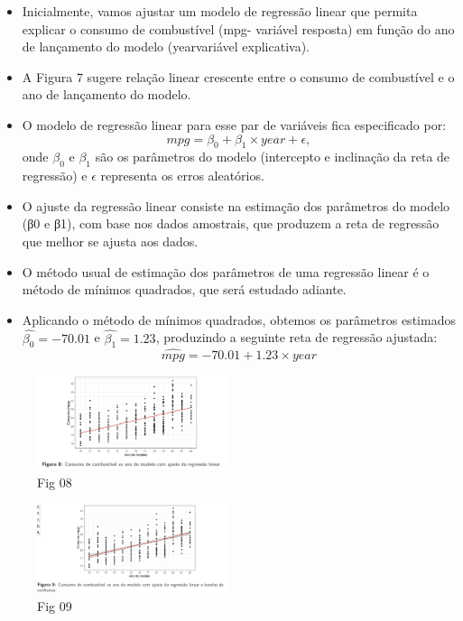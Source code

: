 \documentclass[
]{article}
\begin{document}
\begin{itemize}
\item
  Inicialmente, vamos ajustar um modelo de regressão linear que permita
  explicar o consumo de combustível (mpg- variável resposta) em função
  do ano de lançamento do modelo (yearvariável explicativa).
\item
  A Figura 7 sugere relação linear crescente entre o consumo de
  combustível e o ano de lançamento do modelo.
\item
  O modelo de regressão linear para esse par de variáveis fica
  especificado por: \[
  mpg = \beta_0 + \beta_1 \times year + \epsilon,
  \] onde \(\beta_0\) e \(\beta_1\) são os parâmetros do modelo
  (intercepto e inclinação da reta de regressão) e \(\epsilon\)
  representa os erros aleatórios.
\item
  O ajuste da regressão linear consiste na estimação dos parâmetros do
  modelo (β0 e β1), com base nos dados amostrais, que produzem a reta de
  regressão que melhor se ajusta aos dados.
\item
  O método usual de estimação dos parâmetros de uma regressão linear é o
  método de mínimos quadrados, que será estudado adiante.
\item
  Aplicando o método de mínimos quadrados, obtemos os parâmetros
  estimados \(\hat{\beta_0} = −70.01\) e \(\hat{\beta_1} = 1.23\),
  produzindo a seguinte reta de regressão ajustada: \[
  \hat{mpg} = −70.01 + 1.23 \times year
  \]
\end{itemize}

\begin{figure}
\centering
\includegraphics[width=0.5\textwidth,height=\textheight]{2024-08-10-fig8.png}
\caption{Fig 08}
\end{figure}

\begin{figure}
\centering
\includegraphics[width=0.5\textwidth,height=\textheight]{2024-08-10-fig9.png}
\caption{Fig 09}
\end{figure}
\end{document}
